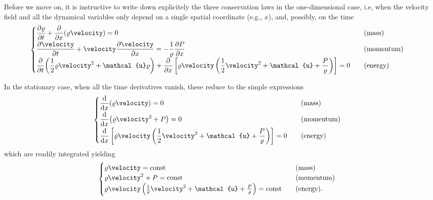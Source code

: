 Before we move on, it is instructive to write down explicitely the three conservation
laws in the one-dimensional case, i.e, when the velocity field
and all the dynamical variables only depend on a single spatial coordinate (e.g., $x$),
and, possibly, on the time
\begin{align}
  \begin{cases}
  \displaystyle\pdv{\density}{t} + \pdv{x}(\density \velocity) = 0
  & \quad\text{(mass)}\\[5pt]
  \displaystyle\pdv{\velocity}{t} + \velocity \pdv{\velocity}{x} = -\frac{1}{\density} \pdv{\pressure}{x}
  & \quad\text{(momentum)}\\[5pt]
  \displaystyle\pdv{t}(\frac{1}{2} \density \velocity^2 + \mathcal{u} \density) +
  \pdv{x} \left[\density \velocity \left( \frac{1}{2} \velocity^2 + \mathcal{u} +
  \frac{\pressure}{\density} \right) \right] = 0
  & \quad\text{(energy)}
\end{cases}
\end{align}

In the stationary case, when all the time derivatives vanish, these reduce to
the simple expressions
\begin{align}\label{eq:conservation_1d_stationary}
  \begin{cases}
  \displaystyle\dv{x}(\density \velocity) = 0
  & \quad\text{(mass)}\\[5pt]
  \displaystyle\dv{x}(\density \velocity^2 + \pressure) = 0
  & \quad\text{(momentum)}\\[5pt]
  \displaystyle\dv{x}
    \left[
    \density \velocity \left( \frac{1}{2} \velocity^2 + \mathcal{u} +
    \frac{\pressure}{\density} \right)
    \right] = 0
  & \quad\text{(energy)}
  \end{cases}
\end{align}
which are readily integrated yielding
\begin{align}
  \begin{cases}
    \density \velocity = \text{const}
    & \quad\text{(mass)}\\
    \density \velocity^2 + \pressure = \text{const}
    & \quad\text{(momentum)}\\
    \density \velocity \left( \frac{1}{2} \velocity^2 +
    \mathcal{u} + \frac{\pressure}{\density} \right) = \text{const}
    & \quad\text{(energy)}.
  \end{cases}
\end{align}


